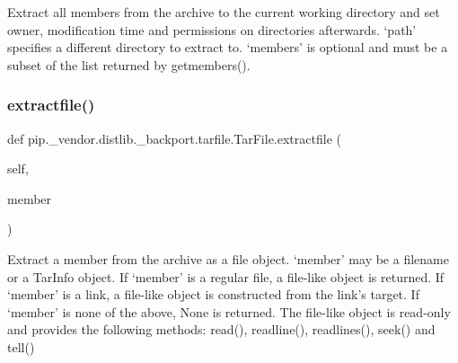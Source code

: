 \begin{DoxyVerb}Extract all members from the archive to the current working
   directory and set owner, modification time and permissions on
   directories afterwards. `path' specifies a different directory
   to extract to. `members' is optional and must be a subset of the
   list returned by getmembers().
\end{DoxyVerb}
 \mbox{\label{classpip_1_1__vendor_1_1distlib_1_1__backport_1_1tarfile_1_1TarFile_a3499a4e361de36b178f052f06e4231fe}} 
\subsubsection{\texorpdfstring{extractfile()}{extractfile()}}
{\footnotesize\ttfamily def pip.\+\_\+vendor.\+distlib.\+\_\+backport.\+tarfile.\+Tar\+File.\+extractfile (\begin{DoxyParamCaption}\item[{}]{self,  }\item[{}]{member }\end{DoxyParamCaption})}

\begin{DoxyVerb}Extract a member from the archive as a file object. `member' may be
   a filename or a TarInfo object. If `member' is a regular file, a
   file-like object is returned. If `member' is a link, a file-like
   object is constructed from the link's target. If `member' is none of
   the above, None is returned.
   The file-like object is read-only and provides the following
   methods: read(), readline(), readlines(), seek() and tell()
\end{DoxyVerb}
 \mbox{\label{classpip_1_1__vendor_1_1distlib_1_1__backport_1_1tarfile_1_1TarFile_a736cebd95f406c6874adc808e041f47f}} 
